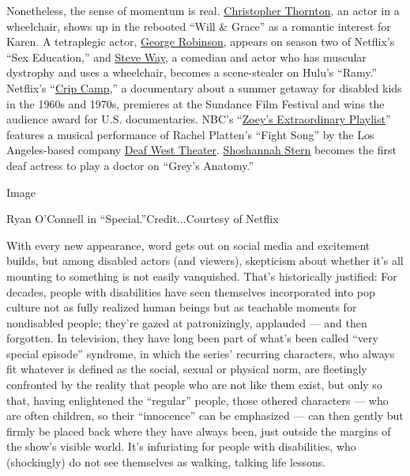 Nonetheless, the sense of momentum is real.
\href{https://www.nytimes3xbfgragh.onion/2011/04/24/movies/mark-ruffalo-and-christopher-thornton-in-sympathy-for-delicious.html}{Christopher
Thornton}, an actor in a wheelchair, shows up in the rebooted ``Will \&
Grace'' as a romantic interest for Karen. A tetraplegic actor,
\href{https://www.teenvogue.com/story/sex-education-george-robinson-isaac}{George
Robinson}, appears on season two of Netflix's ``Sex Education,'' and
\href{https://www.nytimes3xbfgragh.onion/2019/04/18/arts/television/ramy-review.html}{Steve
Way}, a comedian and actor who has muscular dystrophy and uses a
wheelchair, becomes a scene-stealer on Hulu's ``Ramy.'' Netflix's
``\href{https://www.nytimes3xbfgragh.onion/2020/03/24/movies/crip-camp-review.html}{Crip
Camp},'' a documentary about a summer getaway for disabled kids in the
1960s and 1970s, premieres at the Sundance Film Festival and wins the
audience award for U.S. documentaries. NBC's
``\href{https://www.nytimes3xbfgragh.onion/2020/01/07/arts/television/zoeys-extraordinary-playlist-high-school-musical.html}{Zoey's
Extraordinary Playlist}'' features a musical performance of Rachel
Platten's ``Fight Song'' by the Los Angeles-based company
\href{https://www.nytimes3xbfgragh.onion/2015/10/04/theater/lights-gestures-action-how-to-stage-a-broadway-musical-with-deaf-actors.html}{Deaf
West Theater}.
\href{https://www.nytimes3xbfgragh.onion/2020/05/08/style/modern-love-coronavirus-deaf-motherhood-in-a-quiet-world.html}{Shoshannah
Stern} becomes the first deaf actress to play a doctor on ``Grey's
Anatomy.''

Image

Ryan O'Connell in ``Special.''Credit...Courtesy of Netflix

With every new appearance, word gets out on social media and excitement
builds, but among disabled actors (and viewers), skepticism about
whether it's all mounting to something is not easily vanquished. That's
historically justified: For decades, people with disabilities have seen
themselves incorporated into pop culture not as fully realized human
beings but as teachable moments for nondisabled people; they're gazed at
patronizingly, applauded --- and then forgotten. In television, they
have long been part of what's been called ``very special episode''
syndrome, in which the series' recurring characters, who always fit
whatever is defined as the social, sexual or physical norm, are
fleetingly confronted by the reality that people who are not like them
exist, but only so that, having enlightened the ``regular'' people,
those othered characters --- who are often children, so their
``innocence'' can be emphasized --- can then gently but firmly be placed
back where they have always been, just outside the margins of the show's
visible world. It's infuriating for people with disabilities, who
(shockingly) do not see themselves as walking, talking life lessons.

